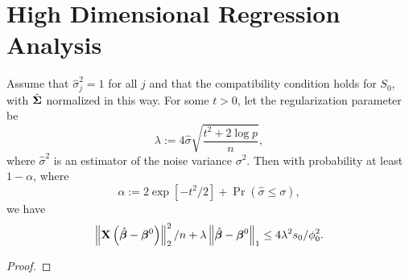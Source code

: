 \chapter{High Dimensional Regression Analysis}

\begin{corollary}
	Assume that $\hat{\sigma}_j^{2}=1$ for all $j$ and that the compatibility condition holds for $S_{0}$, with $\hat{\boldsymbol{\Sigma}}$ normalized in this way. For some $t>0$, let the regularization parameter be
	\begin{equation*}
		\lambda:=4\hat{\sigma}\sqrt{\frac{t^{2}+2\log p}{n}},
	\end{equation*}
	where $\hat{\sigma}^{2}$ is an estimator of the noise variance $\sigma^{2}$. Then with probability at least $1-\alpha$, where
	\begin{equation*}
		\alpha:=2\exp\left[-t^{2}/2\right]+\Pr(\hat{\sigma}\leq\sigma),
	\end{equation*}
	we have
	\begin{equation*}
		\left\|{\bf X}\left(\hat{\boldsymbol{\beta}}-\boldsymbol{\beta}^{0}\right)\right\|_{2}^{2}/n+\lambda\left\|\hat{\boldsymbol{\beta}}-\boldsymbol{\beta}^{0}\right\|_{1}\leq 4 \lambda^{2}s_{0}/\phi_{0}^{2}.
	\end{equation*}
\end{corollary}

\begin{proof}
    
\end{proof}

